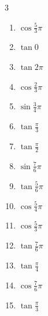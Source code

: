 \begin{multicols}{3}
\begin{enumerate}
\resetques

  \item $\displaystyle \cos{\frac{5}{3}\pi}$

  \item $\displaystyle \tan{0}$
        \phantom{$\displaystyle =0$}

  \item $\displaystyle \tan{2\pi}$
        \phantom{$\displaystyle =0$}

  \item $\displaystyle \cos{\frac{2}{3}\pi}$

  \item $\displaystyle \sin{\frac{3}{4}\pi}$

  \item $\displaystyle \tan{\frac{\pi}{3}}$

  \item $\displaystyle \tan{\frac{\pi}{2}}$
        \phantom{$\displaystyle \quad なし$}

  \item $\displaystyle \sin{\frac{7}{6}\pi}$

  \item $\displaystyle \tan{\frac{5}{6}\pi}$

  \item $\displaystyle \cos{\frac{5}{4}\pi}$

  \item $\displaystyle \cos{\frac{5}{3}\pi}$

  \item $\displaystyle \tan{\frac{7}{6}\pi}$

  \item $\displaystyle \tan{\frac{\pi}{4}}$
        \phantom{$\displaystyle =1$}

  \item $\displaystyle \cos{\frac{7}{6}\pi}$

  \item $\displaystyle \tan{\frac{\pi}{3}}$


\end{enumerate}
\end{multicols}
